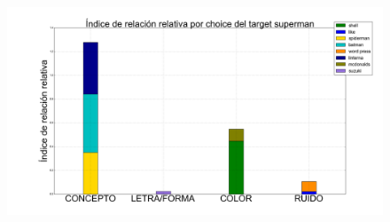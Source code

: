 \documentclass{beamer}
\begin{document}
\begin{frame}
\begin{figure}[h]
\begin{minipage}[c]{1\textwidth}
	\includegraphics[scale=0.108]{superman.png}
  \end{minipage}
\end{figure}
\end{frame}
\end{document}

